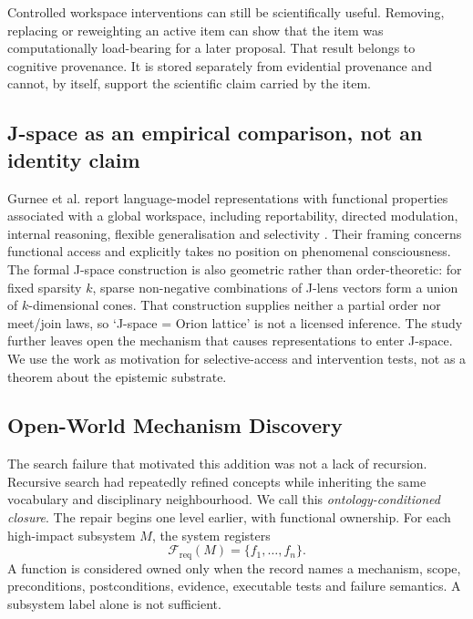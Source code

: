 Controlled workspace interventions can still be scientifically useful. Removing, replacing or reweighting an active item can show that the item was computationally load-bearing for a later proposal. That result belongs to cognitive provenance. It is stored separately from evidential provenance and cannot, by itself, support the scientific claim carried by the item.

\subsection{J-space as an empirical comparison, not an identity claim}

Gurnee et al. report language-model representations with functional properties associated with a global workspace, including reportability, directed modulation, internal reasoning, flexible generalisation and selectivity \cite{gurnee2026}. Their framing concerns functional access and explicitly takes no position on phenomenal consciousness. The formal J-space construction is also geometric rather than order-theoretic: for fixed sparsity \(k\), sparse non-negative combinations of J-lens vectors form a union of \(k\)-dimensional cones. That construction supplies neither a partial order nor meet/join laws, so `J-space = Orion lattice' is not a licensed inference. The study further leaves open the mechanism that causes representations to enter J-space. We use the work as motivation for selective-access and intervention tests, not as a theorem about the epistemic substrate.

\subsection{Open-World Mechanism Discovery}

The search failure that motivated this addition was not a lack of recursion. Recursive search had repeatedly refined concepts while inheriting the same vocabulary and disciplinary neighbourhood. We call this \emph{ontology-conditioned closure}. The repair begins one level earlier, with functional ownership. For each high-impact subsystem \(M\), the system registers
\[
\mathcal F_{\mathrm{req}}(M)=\{f_1,\ldots,f_n\}.
\]
A function is considered owned only when the record names a mechanism, scope, preconditions, postconditions, evidence, executable tests and failure semantics. A subsystem label alone is not sufficient.

